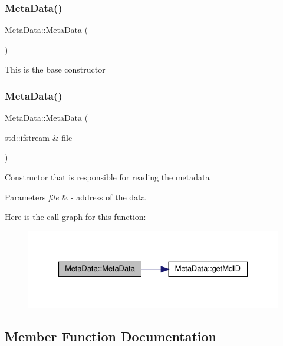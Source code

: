 \subsubsection{\texorpdfstring{Meta\+Data()}{MetaData()}\hspace{0.1cm}{\footnotesize\ttfamily [1/2]}}
{\footnotesize\ttfamily Meta\+Data\+::\+Meta\+Data (\begin{DoxyParamCaption}{ }\end{DoxyParamCaption})\hspace{0.3cm}{\ttfamily [default]}}

This is the base constructor \mbox{\label{classMetaData_aac49325e3507e976fb41690bfa6be536}} 
\subsubsection{\texorpdfstring{Meta\+Data()}{MetaData()}\hspace{0.1cm}{\footnotesize\ttfamily [2/2]}}
{\footnotesize\ttfamily Meta\+Data\+::\+Meta\+Data (\begin{DoxyParamCaption}\item[{std\+::ifstream \&}]{file }\end{DoxyParamCaption})}

Constructor that is responsible for reading the metadata 
\begin{DoxyParams}{Parameters}
{\em file} & -\/ address of the data \\
\hline
\end{DoxyParams}
Here is the call graph for this function\+:\nopagebreak
\begin{figure}[H]
\begin{center}
\leavevmode
\includegraphics[width=327pt]{classMetaData_aac49325e3507e976fb41690bfa6be536_cgraph}
\end{center}
\end{figure}


\subsection{Member Function Documentation}
\mbox{\label{classMetaData_a105bbcd8cfee4f70c0942ec67154079a}} 

